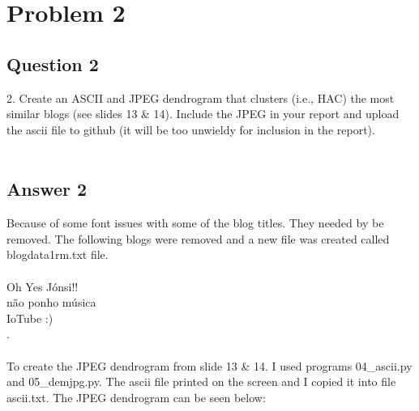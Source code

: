 \documentclass[10pt,letterpaper]{article}
\begin{document}
\pagebreak 
\section{Problem 2}
\subsection{Question 2}
2.  Create an ASCII and JPEG dendrogram that clusters (i.e., HAC) the most similar blogs (see slides 13 \& 14).  Include the JPEG in your report and upload the ascii file to github (it will be too unwieldy for inclusion in the report).\\
\\
\subsection{Answer 2}
Because of some font issues with some of the blog titles.  They needed by be removed.  The following blogs were removed and a new file was created called blogdata1rm.txt file.\\
\\
Oh Yes Jónsi!!\\
não ponho música\\
IoTube     :)\\
.\\
\\
To create the JPEG dendrogram from slide 13 \& 14.  I used programs 04\_ascii.py and 05\_demjpg.py.  The ascii file printed on the screen and I copied it into file ascii.txt.  The JPEG dendrogram can be seen below:\\
\end{document}
